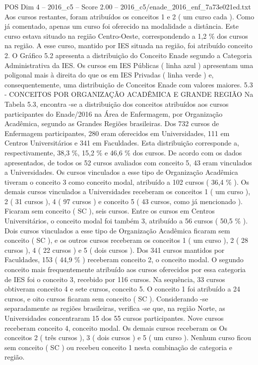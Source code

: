 \begin{textsample}{POS Dim 4 – 2016\_c5 – Score 2.00 – 2016\_c5/enade\_2016\_enf\_7a73e021ed.txt}
Aos cursos restantes, foram atribuídos os conceitos 1 e 2 ( um curso cada ).
Como já comentado, apenas um curso foi oferecido na modalidade a distância.
Este curso estava situado na região Centro-Oeste, correspondendo a 1,2 \% dos cursos na região.
A esse curso, mantido por IES situada na região, foi atribuído conceito 2.
O Gráfico 5.2 apresenta a distribuição do Conceito Enade segundo a Categoria Administrativa da IES.
Os cursos em IES Públicas ( linha azul ) apresentam uma poligonal mais à direita do que os em IES Privadas ( linha verde ) e, consequentemente, uma distribuição de Conceitos Enade com valores maiores. 5.3 - CONCEITOS POR ORGANIZAÇÃO ACADÊMICA E GRANDE REGIÃO Na Tabela 5.3, encontra -se a distribuição dos conceitos atribuídos aos cursos participantes do Enade/2016 na Área de Enfermagem, por Organização Acadêmica, segundo as Grandes Regiões brasileiras.
Dos 732 cursos de Enfermagem participantes, 280 eram oferecidos em Universidades, 111 em Centros Universitários e 341 em Faculdades.
Esta distribuição corresponde a, respectivamente, 38,3 \%, 15,2 \% e 46,6 \% dos cursos.
De acordo com os dados apresentados, de todos os 52 cursos avaliados com conceito 5, 43 eram vinculados a Universidades.
Os cursos vinculados a esse tipo de Organização Acadêmica tiveram o conceito 3 como conceito modal, atribuído a 102 cursos ( 36,4 \% ).
Os demais cursos vinculados a Universidades receberam os conceitos 1 ( um curso ), 2 ( 31 cursos ), 4 ( 97 cursos ) e conceito 5 ( 43 cursos, como já mencionado ).
Ficaram sem conceito ( SC ), seis cursos.
Entre os cursos em Centros Universitários, o conceito modal foi também 3, atribuído a 56 cursos ( 50,5 \% ).
Dois cursos vinculados a esse tipo de Organização Acadêmica ficaram sem conceito ( SC ), e os outros cursos receberam os conceitos 1 ( um curso ), 2 ( 28 cursos ), 4 ( 22 cursos ) e 5 ( dois cursos ).
Dos 341 cursos mantidos por Faculdades, 153 ( 44,9 \% ) receberam conceito 2, o conceito modal.
O segundo conceito mais frequentemente atribuído aos cursos oferecidos por essa categoria de IES foi o conceito 3, recebido por 116 cursos.
Na sequência, 33 cursos obtiveram conceito 4 e sete cursos, conceito 5.
O conceito 1 foi atribuído a 24 cursos, e oito cursos ficaram sem conceito ( SC ).
Considerando -se separadamente as regiões brasileiras, verifica -se que, na região Norte, as Universidades concentraram 15 dos 55 cursos participantes.
Nove cursos receberam conceito 4, conceito modal.
Os demais cursos receberam os Os conceitos 2 ( três cursos ), 3 ( dois cursos ) e 5 ( um curso ).
Nenhum curso ficou sem conceito ( SC ) ou recebeu conceito 1 nesta combinação de categoria e região.

\end{textsample}
